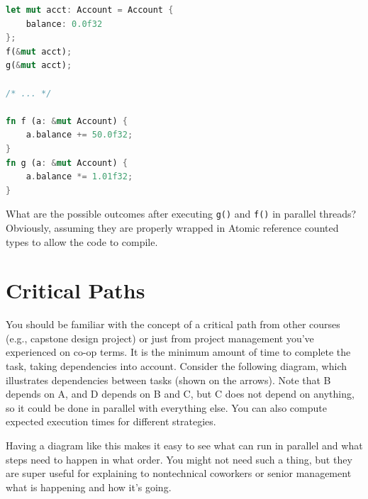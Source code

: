 {\small \begin{lstlisting}[language=Rust]
let mut acct: Account = Account {
    balance: 0.0f32
};
f(&mut acct);
g(&mut acct);

/* ... */

fn f (a: &mut Account) {
    a.balance += 50.0f32;
}
fn g (a: &mut Account) {
    a.balance *= 1.01f32;
}
\end{lstlisting} }

{\sf What are the possible outcomes after executing {\tt g()} and {\tt f()}
in parallel threads? Obviously, assuming they are properly wrapped in Atomic reference counted types to allow the code to compile.} \\[1em]


\section*{Critical Paths}
You should be familiar with the concept of a critical path from other courses (e.g., capstone design project) or just from project management you've experienced on co-op terms. 
It is the minimum amount of time to complete the task, taking dependencies into account.
Consider the following diagram, which illustrates dependencies between
tasks (shown on the arrows). 
Note that B depends on A, and D depends on B and C, but C does
not depend on anything, so it could be done in parallel with
everything else. You can also compute expected execution times
for different strategies.
\begin{center}
\end{center}

 Having a diagram like this makes it easy to see what can run in parallel and what steps need to happen in what order. You might not need such a thing, but they are super useful for explaining to nontechnical coworkers or senior management what is happening and how it's going.


